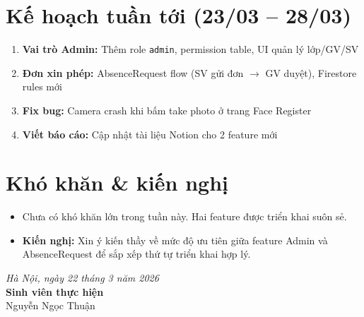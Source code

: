 \documentclass{article}
\begin{document}
\section{Kế hoạch tuần tới (23/03 -- 28/03)}

\begin{enumerate}[leftmargin=1.5em]
  \item \textbf{Vai trò Admin:} Thêm role \texttt{admin}, permission table, UI quản lý lớp/GV/SV
  \item \textbf{Đơn xin phép:} AbsenceRequest flow (SV gửi đơn $\rightarrow$ GV duyệt), Firestore rules mới
  \item \textbf{Fix bug:} Camera crash khi bấm take photo ở trang Face Register
  \item \textbf{Viết báo cáo:} Cập nhật tài liệu Notion cho 2 feature mới
\end{enumerate}

\section{Khó khăn \& kiến nghị}

\begin{itemize}[leftmargin=1.5em]
  \item Chưa có khó khăn lớn trong tuần này. Hai feature được triển khai suôn sẻ.
  \item \textbf{Kiến nghị:} Xin ý kiến thầy về mức độ ưu tiên giữa feature Admin và AbsenceRequest để sắp xếp thứ tự triển khai hợp lý.
\end{itemize}

\vspace{1.5em}
\begin{flushright}
\textit{Hà Nội, ngày 22 tháng 3 năm 2026}\\[1em]
\textbf{Sinh viên thực hiện}\\[2em]
Nguyễn Ngọc Thuận
\end{flushright}
\end{document}
